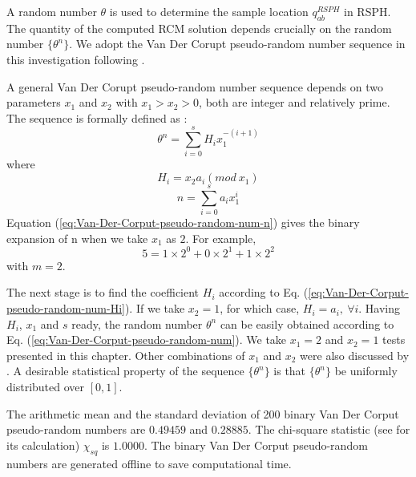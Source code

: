  \label{app:Van-Der-Corput-RDN} 
A random number $\theta$ is used to determine the sample location $q_{ab}^{RSPH}$ in RSPH. The quantity of the computed RCM solution depends crucially on the random number $\{\theta ^n\}$. We adopt the Van Der Corupt pseudo-random number sequence \citep{hammersley2013monte} in this investigation following \citet{colella1982glimm}.

A general Van Der Corupt pseudo-random number sequence depends on two parameters $x_1$ and $x_2$ with $x_1 > x_2 > 0$, both are integer and relatively prime. The sequence is formally defined as \citep{hammersley2013monte}:
\begin{equation}
\theta ^n = \sum_{i=0}^{s} H_i x_1^{-(i+1)}
\label{eq:Van-Der-Corput-pseudo-random-num}
\end{equation}
where
\begin{equation}
H_i = x_2 a_i(mod \ x_1)
\label{eq:Van-Der-Corput-pseudo-random-num-Hi}
\end{equation} 
\begin{equation}
n = \sum_{i=0}^{s} a_i x_1^i
\label{eq:Van-Der-Corput-pseudo-random-num-n}
\end{equation} 
Equation (\ref{eq:Van-Der-Corput-pseudo-random-num-n}) gives the binary expansion of n when we take $x_1$ as $2$. For example,
\begin{equation}
5=1 \times 2^0 + 0 \times 2^1 + 1 \times 2^2
\end{equation}
with $m=2$. 

The next stage is to find the coefficient $H_i$ according to Eq. (\ref{eq:Van-Der-Corput-pseudo-random-num-Hi}). If we take $x_2 = 1$, for which case, $H_i = a_i, \ \forall i$. Having $H_i$, $x_1$ and $s$ ready, the random number $\theta ^n $ can be easily obtained according to Eq. (\ref{eq:Van-Der-Corput-pseudo-random-num}).
We take $x_1=2$  and $x_2 =1$ tests presented in this chapter. Other combinations of $x_1$ and $x_2$ were also discussed by \citet{toro2013riemann}. A desirable statistical property of the sequence $\{\theta ^n\}$ is that $\{\theta ^n\}$ be uniformly distributed over $[0,1]$.
 
The arithmetic mean and the standard deviation of 200 binary Van Der Corput pseudo-random numbers are $0.49459$ and $0.28885$. The chi-square statistic (see \citet{toro2013riemann} for its calculation) $\chi_{sq}$ is $1.0000$. 
The binary Van Der Corput pseudo-random numbers are generated offline to save computational time.
